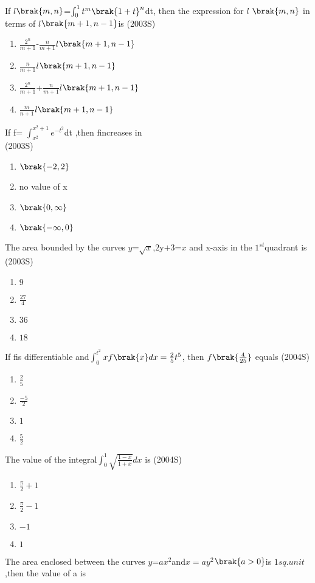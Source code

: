 \iffalse
\title{18.Definite Integrals and Applications of Integrals}
\author{AI24BTECH11006-Bugada Roopansha}
\section{mcq-single} 
\fi 

\item If $l$$\brak{m,n}$=$\int_{0}^{1}t^m\brak{1+t}^n$dt, then the expression for $l$ $\brak{m,n}$ in terms of $l$$\brak{m+1,n-1}$is
\hfill{(2003S)}
\begin{enumerate}
\item $\frac{2^n}{m+1}$-$\frac{n}{m+1}$$l$$\brak{m+1,n-1}$
\item $\frac{n}{m+1}$$l$$\brak{m+1,n-1}$
\item $\frac{2^n}{m+1}$+$\frac{n}{m+1}$$l$$\brak{m+1,n-1}$
\item $\frac{m}{n+1}$$l\brak{m+1,n-1}$
\end{enumerate}
\item If f= $\int_{x^2}^{x^2+1}e^{-t^2}$dt ,then fincreases in\\
\hfill{(2003S)}
\begin{enumerate}
\item  $\brak{-2,2}$
\item no value of x
\item  $\brak{0,\infty}$
\item  $\brak{-\infty,0}$
\end{enumerate}
\item The area bounded by the curves  $y$=$\sqrt{x}$,$2$y$+3$=$x$ and x-axis in the $1^{st}$quadrant is
\hfill{(2003S)}
\begin{enumerate}
\item $9$
\item$\frac{27}{4}$
\item $36$
\item $18$
\end{enumerate}
\item If fis differentiable and$\int_{0}^{t^2}$$xf\brak{x}dx=\frac{2}{5}t^5$, then $f\brak{\frac{4}{25}}$ equals
\hfill{(2004S)}
\begin{enumerate}
\item $\frac{2}{5}$
\item $\frac{-5}{2}$
\item  $1$
\item $\frac{5}{2}$
\end{enumerate}
\item The value of the integral$\int_{0}^{1}\sqrt{\frac{1-x}{1+x}}dx$ is
\hfill{(2004S)}
\begin{enumerate}
\item$\frac{\pi}{2}+1$
\item$\frac{\pi}{2}-1$
\item$-1$
\item$1$
\end{enumerate}
\item The area enclosed between the curves 
$y$=$ax^2$and$x=ay^2$$\brak{a>0}$is $1 sq.unit$,then the value of a is
